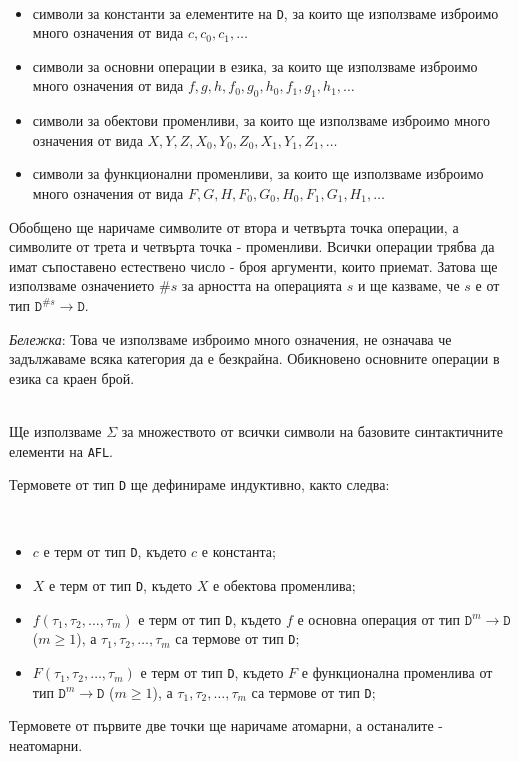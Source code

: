 \documentclass[12pt,twoside,a4paper]{article}
\begin{document}
	\begin{definition}\label{def:symbols}~
		\begin{itemize}
			\item символи за константи за елементите на \texttt{D}, за които ще използваме изброимо много означения от вида $c, c_0, c_1, \dots$
			\item символи за основни операции в езика, за които ще използваме изброимо много означения от вида $f,g,h,f_0,g_0,h_0,f_1,g_1,h_1,\dots$
			\item символи за обектови променливи, за които ще използваме изброимо много означения от вида $X,Y,Z,X_0,Y_0,Z_0,X_1,Y_1,Z_1,\dots$
			\item символи за функционални променливи, за които ще използваме изброимо много означения от вида $F,G,H,F_0,G_0,H_0,F_1,G_1,H_1,\dots$
		\end{itemize}
		Обобщено ще наричаме символите от втора и четвърта точка операции, а символите от трета и четвърта точка - променливи. Всички операции трябва да имат съпоставено естествено число - броя аргументи, които приемат. Затова ще използваме означението $\#s$ за арността на операцията $s$ и ще казваме, че $s$ е от тип $\texttt{D}^{\#s} \to \texttt{D}$.
		
		\textit{Бележка}: Това че използваме изброимо много означения, не означава че задължаваме всяка категория да е безкрайна. Обикновено основните операции в езика са краен брой.
	\end{definition}
	
	\begin{denotation}~\\
		\indent Ще използваме $\Sigma$ за множеството от всички символи на базовите синтактичните елементи на \texttt{AFL}.
	\end{denotation}
	
	Термовете от тип \texttt{D} ще дефинираме индуктивно, както следва:
	
	\begin{definition}\label{def:term-AFL}~
		\begin{itemize}
			\item $c$ е терм от тип \texttt{D}, където $c$ е константа;
			\item $X$ е терм от тип \texttt{D}, където $X$ е обектова променлива;
			\item $f(\tau_1,\tau_2,\dots,\tau_m)$ е терм от тип \texttt{D}, където $f$ е основна операция от тип $\texttt{D}^{m} \to \texttt{D}$ ($m \ge 1$), а $\tau_1,\tau_2,\dots,\tau_m$ са термове от тип \texttt{D};
			\item $F(\tau_1,\tau_2,\dots,\tau_m)$ е терм от тип \texttt{D}, където $F$ е функционална променлива от тип $\texttt{D}^m \to \texttt{D}$ ($m \ge 1$), а $\tau_1,\tau_2,\dots,\tau_m$ са термове от тип \texttt{D};
		\end{itemize}
		Термовете от първите две точки ще наричаме атомарни, а останалите - неатомарни.
	\end{definition}
	
\end{document}
